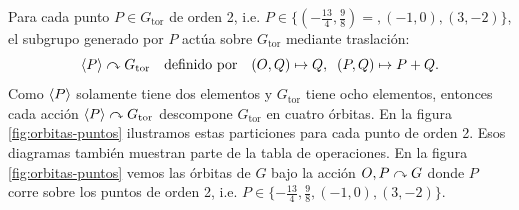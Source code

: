 Para cada punto $P\in G_\mathrm{tor}$ de orden 2, i.e. $P\in\{(-\tfrac{13}{4},\tfrac{9}{8})=,(-1,0),(3,-2)\}$, el subgrupo generado por $P$ actúa sobre $G_\mathrm{tor}$ mediante traslación:
\[
	\langle P \rangle\curvearrowright G_\mathrm{tor}\quad\text{definido por}\quad (O,Q)\mapsto Q,\;\; (P,Q)\mapsto P+Q.
\]
Como $\langle P \rangle$ solamente tiene dos elementos y $G_\mathrm{tor}$ tiene ocho elementos, entonces cada acción $\langle P \rangle\curvearrowright G_\mathrm{tor}$ descompone $G_\mathrm{tor}$ en cuatro órbitas. En la figura \ref{fig:orbitas-puntos} ilustramos estas particiones para cada punto de orden 2. Esos diagramas también muestran parte de la tabla de operaciones. En la figura \ref{fig:orbitas-puntos} vemos las órbitas de $G$ bajo la acción ${O,P}\curvearrowright G$ donde $P$ corre sobre los puntos de orden 2, i.e. $P\in\{-\tfrac{13}{4},\tfrac{9}{8},(-1,0),(3,-2)\}$.

